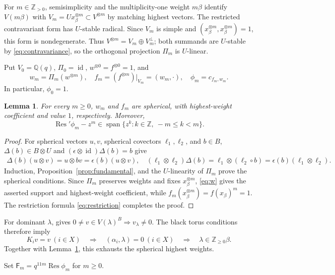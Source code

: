 \documentclass[12pt,reqno]{amsart}
\theoremstyle{plain}
\newtheorem{lemma}[theorem]{Lemma}
\theoremstyle{definition}
\numberwithin{equation}{section}
\newcommand{\kk}{\mathbb Q(q)}
\newcommand{\Res}{\operatorname{Res}}
\newcommand{\eps}{\epsilon}
\newcommand{\Span}{\operatorname{span}}
\newcommand{\tens}{\otimes}
\newcommand{\id}{\operatorname{id}}
\begin{document}
For $m\in\mathbb Z_{>0}$, semisimplicity and the multiplicity-one
weight $m\beta$ identify $V(m\beta)$ with
$V_m=Ux_\beta^{\tens m}\subset V^{\tens m}$ by matching highest vectors.
The restricted contravariant form has $U$-stable radical.
Since $V_m$ is simple and
$(x_\beta^{\tens m},x_\beta^{\tens m})=1$, this form is nondegenerate.
Thus $V^{\tens m}=V_m\oplus V_m^\perp$; both summands are
$U$-stable by \eqref{eq:contravariance}, so the orthogonal projection
$\Pi_m$ is $U$-linear.

Put $V_0=\kk$, $\Pi_0=\id$, $w^{\tens0}=f^{\tens0}=1$, and
\begin{equation}\label{eq:allspheres}
	w_m=\Pi_m(w^{\tens m}),\quad
	f_m=(f^{\tens m})|_{V_m}=(w_m,\cdot),\quad
	\phi_m=c_{f_m,w_m}.
\end{equation}
In particular, $\phi_0=1$.

\begin{lemma}\label{lem:allspheres}
	For every $m\geq0$, $w_m$ and $f_m$ are spherical, with
	highest-weight coefficient and value $1$, respectively. Moreover,
	\[
	\Res'\phi_m-z^m
	\in\Span\{z^k:k\in\mathbb Z,\ -m\leq k<m\}.
	\]
\end{lemma}

\begin{proof}
For spherical vectors $u,v$, spherical covectors $\ell_1,\ell_2$,
and $b\in B$, $\Delta(b)\in B\tens U$ and
$(\eps\tens\id)\Delta(b)=b$ give
\[
\begin{aligned}
 \Delta(b)(u\tens v)=u\tens bv=\eps(b)(u\tens v),\quad
 (\ell_1\tens\ell_2)\Delta(b)
 =\ell_1\tens(\ell_2\circ b)
 =\eps(b)(\ell_1\tens\ell_2).
\end{aligned}
\]
Induction, Proposition~\ref{prop:fundamental}, and the $U$-linearity
	of $\Pi_m$ prove the spherical conditions.
	Since $\Pi_m$ preserves weights and fixes $x_\beta^{\tens m}$,
	\eqref{eq:w} gives the asserted support and highest-weight
	coefficient, while
	$f_m(x_\beta^{\tens m})=f(x_\beta)^m=1$.
	The restriction formula \eqref{eq:restriction} completes the proof.
\end{proof}

For dominant $\lambda$, \cite[Proposition~4.1(i)]{Mee26} gives
$0\ne v\in V(\lambda)^B\Rightarrow v_\lambda\ne0$.
The black torus conditions therefore imply
\[
K_iv=v\ (i\in X)
\quad\Longrightarrow\quad
(\alpha_i,\lambda)=0\ (i\in X)
\quad\Longrightarrow\quad
\lambda\in\mathbb Z_{\geq0}\beta.
\]
Together with Lemma~\ref{lem:allspheres}, this exhausts the spherical
highest weights.

Set $\mathsf{F}_m=q^{11m}\Res\phi_m$ for $m\geq0$.
\end{document}
